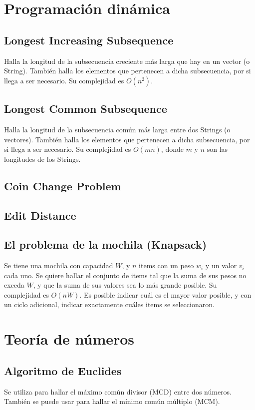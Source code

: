 \documentclass{article}
\begin{document}
\begin{multicols}{2}
\section{Programación dinámica}
	\subsection{Longest Increasing Subsequence}
		Halla la longitud de la subsecuencia creciente más larga que hay en un vector (o String). También halla los elementos que pertenecen a dicha subsecuencia, por si llega a ser necesario. Su complejidad es \( O(n^2) \).
		
	\subsection{Longest Common Subsequence}
		Halla la longitud de la subsecuencia común más larga entre dos Strings (o vectores). También halla los elementos que pertenecen a dicha subsecuencia, por si llega a ser necesario. Su complejidad es \( O(mn) \), donde \( m \) y \( n \) son las longitudes de los Strings.
		
	\subsection{Coin Change Problem}
	\subsection{Edit Distance}
	\subsection{El problema de la mochila (Knapsack)}
	Se tiene una mochila con capacidad \( W \), y \( n \) items con un peso \( w_i \) y un valor \( v_i \) cada uno. Se quiere hallar el conjunto de items tal que la suma de sus pesos no exceda \( W \), y que la suma de sus valores sea lo más grande posible. Su complejidad es \( O(nW) \). Es posible indicar cuál es el mayor valor posible, y con un ciclo adicional, indicar exactamente cuáles items se seleccionaron.
	

\section{Teoría de números}
	\subsection{Algoritmo de Euclides}
	Se utiliza para hallar el máximo común divisor (MCD) entre dos números. También se puede usar para hallar el mínimo común múltiplo (MCM).
	


\end{multicols}
\end{document}
